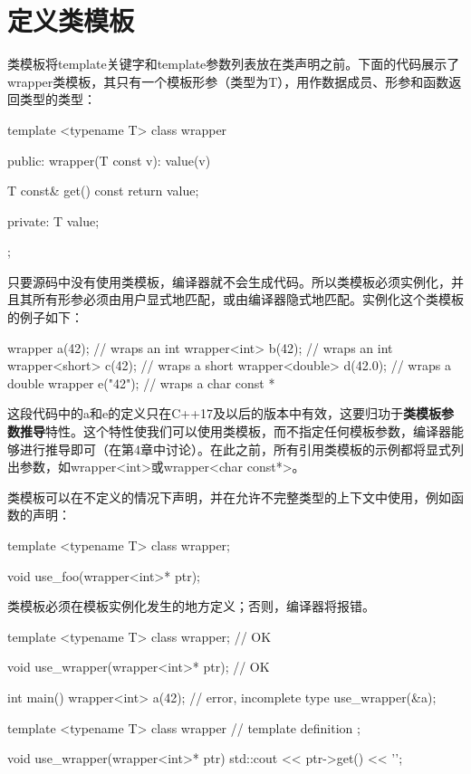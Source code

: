 \section{定义类模板}
类模板将template关键字和template参数列表放在类声明之前。下面的代码展示了wrapper类模板，其只有一个模板形参（类型为T），用作数据成员、形参和函数返回类型的类型：

\begin{cpp}
template <typename T>
class wrapper
{
public:
	wrapper(T const v): value(v)
	{ }
	
	T const& get() const { return value; }
	
private:
	T value;
};
\end{cpp}

只要源码中没有使用类模板，编译器就不会生成代码。所以类模板必须实例化，并且其所有形参必须由用户显式地匹配，或由编译器隐式地匹配。实例化这个类模板的例子如下：

\begin{cpp}
wrapper a(42); // wraps an int
wrapper<int> b(42); // wraps an int
wrapper<short> c(42); // wraps a short
wrapper<double> d(42.0); // wraps a double
wrapper e("42"); // wraps a char const *
\end{cpp}

这段代码中的a和e的定义只在C++17及以后的版本中有效，这要归功于\textbf{类模板参数推导}特性。这个特性使我们可以使用类模板，而不指定任何模板参数，编译器能够进行推导即可（在第4章中讨论）。在此之前，所有引用类模板的示例都将显式列出参数，如wrapper<int>或wrapper<char const*>。

类模板可以在不定义的情况下声明，并在允许不完整类型的上下文中使用，例如函数的声明：

\begin{cpp}
template <typename T>
class wrapper;

void use_foo(wrapper<int>* ptr);
\end{cpp}

类模板必须在模板实例化发生的地方定义；否则，编译器将报错。

\begin{cpp}
template <typename T>
class wrapper; // OK

void use_wrapper(wrapper<int>* ptr); // OK

int main()
{
	wrapper<int> a(42); // error, incomplete type
	use_wrapper(&a);
}

template <typename T>
class wrapper
{
	// template definition
};

void use_wrapper(wrapper<int>* ptr)
{
	std::cout << ptr->get() << '\n';
}
\end{cpp}

